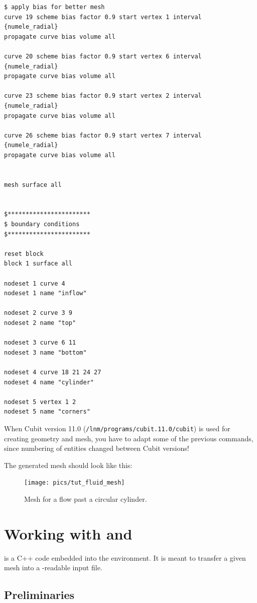 \begin{small}
\begin{verbatim}
$ apply bias for better mesh
curve 19 scheme bias factor 0.9 start vertex 1 interval {numele_radial}
propagate curve bias volume all

curve 20 scheme bias factor 0.9 start vertex 6 interval {numele_radial}
propagate curve bias volume all

curve 23 scheme bias factor 0.9 start vertex 2 interval {numele_radial}
propagate curve bias volume all

curve 26 scheme bias factor 0.9 start vertex 7 interval {numele_radial}
propagate curve bias volume all


mesh surface all


$***********************
$ boundary conditions 
$***********************

reset block
block 1 surface all

nodeset 1 curve 4
nodeset 1 name "inflow"

nodeset 2 curve 3 9
nodeset 2 name "top"

nodeset 3 curve 6 11
nodeset 3 name "bottom"

nodeset 4 curve 18 21 24 27
nodeset 4 name "cylinder"

nodeset 5 vertex 1 2
nodeset 5 name "corners"
\end{verbatim} \end{small}

When Cubit version 11.0 (\texttt{/lnm/programs/cubit.11.0/cubit}) is used for 
creating geometry and mesh, you have to adapt some of the previous commands,
since numbering of entities changed between Cubit versions!

The generated mesh should look like this:
\begin{figure}[H]
 \begin{center}
  \texttt{[image: pics/tut\_fluid\_mesh]}   
  \caption{Mesh for a flow past a circular cylinder.}
  \label{fig:domainDecomposition}
\end{center}
\end{figure}

\section{Working with \prexo and \baci{}}

\prexo is a C++ code embedded into the \baci{} environment. It is meant to
transfer a given mesh into a \baci{}-readable input file.

\subsection{Preliminaries}


